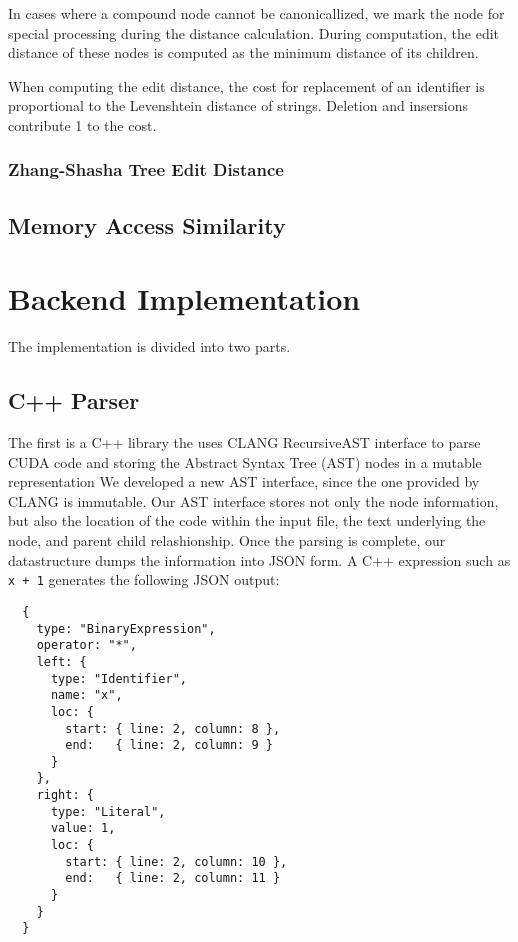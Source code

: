 \documentclass[nocopyrightspace]{sigchi}
\begin{document}
In cases where a compound node cannot be canonicallized, we mark the node for
special processing during the distance calculation. During computation, the edit
distance of these nodes is computed as the minimum distance of its children.

When computing the edit distance, the cost for replacement of an identifier is
proportional to the Levenshtein distance of strings. Deletion and insersions
contribute 1 to the cost.

\subsubsection{Zhang-Shasha Tree Edit Distance}



\subsection{Memory Access Similarity}



\section{Backend Implementation}

The implementation is divided into two parts.


\subsection{C++ Parser}

The first is a C++ library the uses CLANG RecursiveAST interface to parse CUDA code
and storing the Abstract Syntax Tree (AST) nodes in a mutable representation
We developed a new AST interface, since the one provided by CLANG is immutable.
Our AST interface stores not only the node information, but also the location
of the code within the input file, the text underlying the node, and parent child
relashionship. Once the parsing is complete, our datastructure dumps the information
into JSON form. A C++ expression such as {\tt x + 1} generates the following JSON
output:

\begin{verbatim}
  {
    type: "BinaryExpression",
    operator: "*",
    left: {
      type: "Identifier",
      name: "x",
      loc: {
        start: { line: 2, column: 8 },
        end:   { line: 2, column: 9 }
      }
    },
    right: {
      type: "Literal",
      value: 1,
      loc: {
        start: { line: 2, column: 10 },
        end:   { line: 2, column: 11 }
      }
    }
  }
\end{verbatim}
\end{document}
